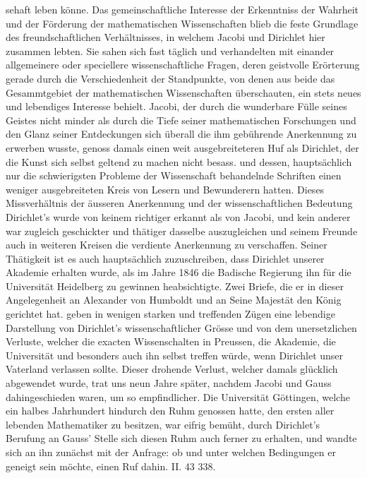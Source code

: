 \documentclass[11pt]{article}
\begin{document}
\noindent sehaft leben könne. Das gemeinschaftliche Interesse der Erkenntniss der Wahrheit und der Förderung der mathematischen Wissenschaften blieb die feste Grundlage des freundschaftlichen Verhältnisses, in welchem Jacobi und Dirichlet hier zusammen lebten. Sie sahen sich fast täglich und verhandelten mit einander allgemeinere oder speciellere wissenschaftliche Fragen, deren geistvolle Erörterung gerade durch die Verschiedenheit der Standpunkte, von denen aus beide das Gesammtgebiet der mathematischen Wissenschaften überschauten, ein stets neues und lebendiges Interesse behielt. Jacobi, der durch die wunderbare Fülle seines Geistes nicht minder als durch die Tiefe seiner mathematischen Forschungen und den Glanz seiner Entdeckungen sich überall die ihm gebührende Anerkennung zu erwerben wusste, genoss damals einen weit ausgebreiteteren Huf als Dirichlet, der die Kunst sich selbst geltend zu machen nicht besass. und dessen, hauptsächlich nur die schwierigsten Probleme der Wissenschaft behandelnde Schriften einen weniger ausgebreiteten Kreis von Lesern und Bewunderern hatten. Dieses Missverhältnis der äusseren Anerkennung und der wissenschaftlichen Bedeutung Dirichlet’s wurde von keinem richtiger erkannt als von Jacobi, und kein anderer war zugleich geschickter und thätiger dasselbe auszugleichen und seinem Freunde auch in weiteren Kreisen die verdiente Anerkennung zu verschaffen. Seiner Thätigkeit ist es auch hauptsächlich zuzuschreiben, dass Dirichlet unserer Akademie erhalten wurde, als im Jahre 1846 die Badische Regierung ihn für die Universität Heidelberg zu gewinnen heabsichtigte. Zwei Briefe, die er in dieser Angelegenheit an Alexander von Humboldt und an Seine Majestät den König gerichtet hat. geben in wenigen starken und treffenden Zügen eine lebendige Darstellung von Dirichlet’s wissenschaftlicher Grösse und von dem unersetzlichen Verluste, welcher die exacten Wissenschalten in Preussen, die Akademie, die Universität und besonders auch ihn selbst treffen würde, wenn Dirichlet unser Vaterland verlassen sollte. Dieser drohende Verlust, welcher damals glücklich abgewendet wurde, trat uns neun Jahre später, nachdem Jacobi und Gauss dahingeschieden waren, um so empfindlicher. Die Universität Göttingen, welche ein halbes Jahrhundert hindurch den Ruhm genossen hatte, den ersten aller lebenden Mathematiker zu besitzen, war eifrig bemüht, durch Dirichlet’s Berufung an Gauss’ Stelle sich diesen Ruhm auch ferner zu erhalten, und wandte sich an ihn zunächst mit der Anfrage: ob und unter welchen Bedingungen er geneigt sein möchte, einen Ruf dahin. II. 43 338.
\par
\end{document}
